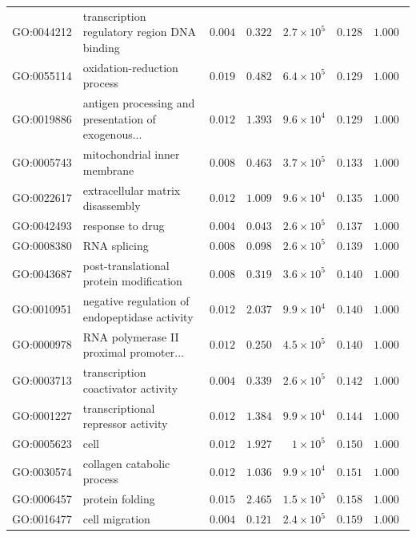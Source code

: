 \documentclass{article}
\begin{document}
\begin{center}
\begin{longtable*}{|l|l|r|r|r|r|r|}
            GO:0044212 & transcription regulatory region DNA binding & $ 0.004$ & $ 0.322$ & $2.7\times 10^{5}$ & $ 0.128$ & $ 1.000~~$ \\
            GO:0055114 & oxidation-reduction process & $ 0.019$ & $ 0.482$ & $6.4\times 10^{5}$ & $ 0.129$ & $ 1.000~~$ \\
            GO:0019886 & antigen processing and presentation of exogenous... & $ 0.012$ & $ 1.393$ & $9.6\times 10^{4}$ & $ 0.129$ & $ 1.000~~$ \\
            GO:0005743 & mitochondrial inner membrane & $ 0.008$ & $ 0.463$ & $3.7\times 10^{5}$ & $ 0.133$ & $ 1.000~~$ \\
            GO:0022617 & extracellular matrix disassembly & $ 0.012$ & $ 1.009$ & $9.6\times 10^{4}$ & $ 0.135$ & $ 1.000~~$ \\
            GO:0042493 & response to drug & $ 0.004$ & $ 0.043$ & $2.6\times 10^{5}$ & $ 0.137$ & $ 1.000~~$ \\
            GO:0008380 & RNA splicing & $ 0.008$ & $ 0.098$ & $2.6\times 10^{5}$ & $ 0.139$ & $ 1.000~~$ \\
            GO:0043687 & post-translational protein modification & $ 0.008$ & $ 0.319$ & $3.6\times 10^{5}$ & $ 0.140$ & $ 1.000~~$ \\
            GO:0010951 & negative regulation of endopeptidase activity & $ 0.012$ & $ 2.037$ & $9.9\times 10^{4}$ & $ 0.140$ & $ 1.000~~$ \\
            GO:0000978 & RNA polymerase II proximal promoter... & $ 0.012$ & $ 0.250$ & $4.5\times 10^{5}$ & $ 0.140$ & $ 1.000~~$ \\
            GO:0003713 & transcription coactivator activity & $ 0.004$ & $ 0.339$ & $2.6\times 10^{5}$ & $ 0.142$ & $ 1.000~~$ \\
            GO:0001227 & transcriptional repressor activity & $ 0.012$ & $ 1.384$ & $9.9\times 10^{4}$ & $ 0.144$ & $ 1.000~~$ \\
            GO:0005623 & cell & $ 0.012$ & $ 1.927$ & $ 1\times 10^{5}$ & $ 0.150$ & $ 1.000~~$ \\
            GO:0030574 & collagen catabolic process & $ 0.012$ & $ 1.036$ & $9.9\times 10^{4}$ & $ 0.151$ & $ 1.000~~$ \\
            GO:0006457 & protein folding & $ 0.015$ & $ 2.465$ & $1.5\times 10^{5}$ & $ 0.158$ & $ 1.000~~$ \\
            GO:0016477 & cell migration & $ 0.004$ & $ 0.121$ & $2.4\times 10^{5}$ & $ 0.159$ & $ 1.000~~$ \\

\end{longtable*}
\end{center}
\end{document}
